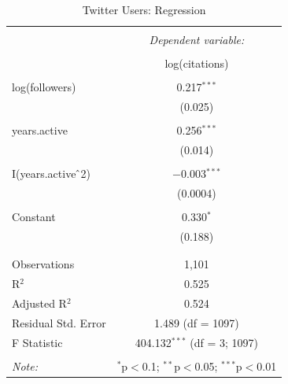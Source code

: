 \documentclass[12pt, Times New Roman]{article}
\begin{document}
\begin{table}[!htbp] \centering 
  \caption{Twitter Users: Regression} 
  \label{table4} 
\begin{tabular}{@{\extracolsep{5pt}}lc} 
\\[-1.8ex]\hline 
\hline \\[-1.8ex] 
 & \multicolumn{1}{c}{\textit{Dependent variable:}} \\ 
\cline{2-2} 
\\[-1.8ex] & log(citations) \\ 
\hline \\[-1.8ex] 
 log(followers) & 0.217$^{***}$ \\ 
  & (0.025) \\ 
  & \\ 
 years.active & 0.256$^{***}$ \\ 
  & (0.014) \\ 
  & \\ 
 I(years.active$\hat{\mkern6mu}$2) & $-$0.003$^{***}$ \\ 
  & (0.0004) \\ 
  & \\ 
 Constant & 0.330$^{*}$ \\ 
  & (0.188) \\ 
  & \\ 
\hline \\[-1.8ex] 
Observations & 1,101 \\ 
R$^{2}$ & 0.525 \\ 
Adjusted R$^{2}$ & 0.524 \\ 
Residual Std. Error & 1.489 (df = 1097) \\ 
F Statistic & 404.132$^{***}$ (df = 3; 1097) \\ 
\hline 
\hline \\[-1.8ex] 
\textit{Note:}  & \multicolumn{1}{r}{$^{*}$p$<$0.1; $^{**}$p$<$0.05; $^{***}$p$<$0.01} \\ 
\end{tabular} 
\end{table}
\end{document}
